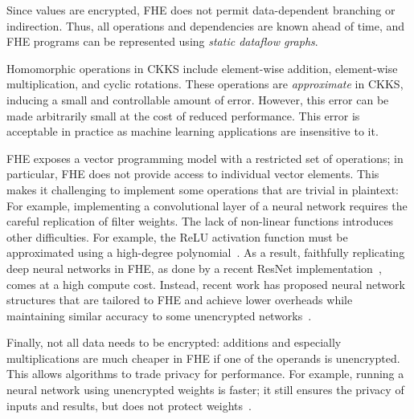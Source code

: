Since values are encrypted, FHE does not permit data-dependent branching or indirection.
Thus, all operations and dependencies are known ahead of time, and FHE programs can
be represented using \emph{static dataflow graphs}.

Homomorphic operations in CKKS include element-wise addition, element-wise multiplication,
and cyclic rotations.
These operations are \emph{approximate} in CKKS, inducing a small and
controllable amount of error. However, this error can be made arbitrarily small at the
cost of reduced performance. %
This error is acceptable in practice as machine learning applications
are insensitive to it.

FHE exposes a vector programming model with a restricted set of operations; in particular,
FHE does not provide access to individual vector elements.
This makes it challenging to implement some operations
that are trivial in plaintext:
For example,
implementing a convolutional layer of a neural network requires the careful
replication of filter weights.
The lack of non-linear functions introduces other difficulties.
For example, the ReLU activation function must be approximated
using a high-degree polynomial~\cite{lee:arxiv21:resnet-fhe}.
%
As a result, faithfully replicating deep neural networks in FHE,
as done by a recent ResNet implementation~\cite{lee:arxiv21:resnet-fhe}, comes at a high compute cost.
Instead, recent work has proposed neural network structures that are tailored to
FHE and achieve lower overheads while maintaining similar accuracy to some unencrypted networks~\cite{brutzkus:icml19:lola}.

Finally, not all data needs to be encrypted:
additions and especially multiplications are much cheaper in FHE if one of the operands is unencrypted.
This allows algorithms to trade privacy for performance.
For example, running a neural network using unencrypted weights is faster; it
still ensures the privacy of inputs and results, but does not
protect weights~\cite{brutzkus:icml19:lola}.


